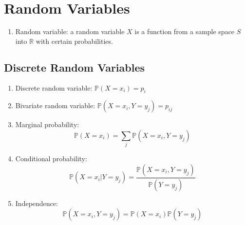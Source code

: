 \documentclass[%
 aip,
 jmp,%
 amsmath,amssymb,
 reprint,%
]{revtex4-1}
\def\R{{\mathbb R}}
\def\P{\mathbb{P}}
\begin{document}
\section{Random Variables}

\begin{enumerate}
    \item[] Random variable: a random variable $X$ is a function from a
    sample space $S$ into $\R$ with certain probabilities.
\end{enumerate}

\subsection{Discrete Random Variables}
\begin{enumerate}
  \item Discrete random variable: $\P(X = x_i) = p_i$
  \item Bivariate random variable: $\P(X=x_i, Y=y_j) = p_{ij}$
  \item Marginal probability: $$\P(X=x_i) = \sum_j \P(X=x_i, Y=y_j)$$
  \item Conditional probability: $$\P(X=x_i|Y=y_j) = \frac{\P(X=x_i,Y=y_j)}{\P(Y=y_j)}$$
  \item Independence: $$\P(X=x_i,Y=y_j)=\P(X=x_i)\P(Y=y_j)$$
\end{enumerate}
\end{document}
